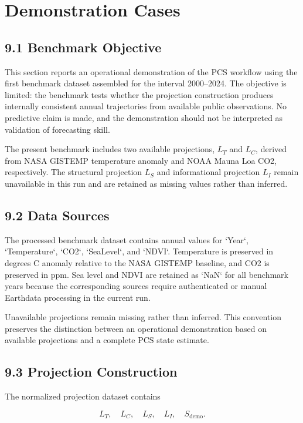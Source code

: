 \section{Demonstration Cases}

\subsection{9.1 Benchmark Objective}

This section reports an operational demonstration of the PCS workflow using the first benchmark dataset assembled for the interval 2000--2024. The objective is limited: the benchmark tests whether the projection construction produces internally consistent annual trajectories from available public observations. No predictive claim is made, and the demonstration should not be interpreted as validation of forecasting skill.

The present benchmark includes two available projections, \(L_T\) and \(L_C\), derived from NASA GISTEMP temperature anomaly and NOAA Mauna Loa CO2, respectively. The structural projection \(L_S\) and informational projection \(L_I\) remain unavailable in this run and are retained as missing values rather than inferred.

\subsection{9.2 Data Sources}

The processed benchmark dataset contains annual values for `Year`, `Temperature`, `CO2`, `SeaLevel`, and `NDVI`. Temperature is preserved in degrees C anomaly relative to the NASA GISTEMP baseline, and CO2 is preserved in ppm. Sea level and NDVI are retained as `NaN` for all benchmark years because the corresponding sources require authenticated or manual Earthdata processing in the current run.

Unavailable projections remain missing rather than inferred. This convention preserves the distinction between an operational demonstration based on available projections and a complete PCS state estimate.

\subsection{9.3 Projection Construction}

The normalized projection dataset contains

\[
L_T,\quad L_C,\quad L_S,\quad L_I,\quad S_{\mathrm{demo}}.
\]

